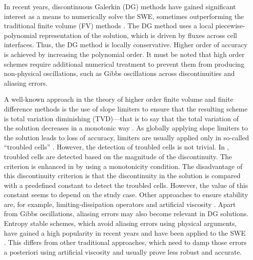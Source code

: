 In recent years, discontinuous Galerkin (DG) methods have gained significant interest as a means to numerically solve the SWE, sometimes outperforming the traditional finite volume (FV) methods \cite{CaviedesVoullieme2015, kesserwani2015,  Vater20151, Marras:2016, Kesserwani2019, Vater2019,  CaviedesVoullieme2020, NavasMontilla2020}.  The DG method uses a local piecewise-polynomial representation of the solution, which is driven by fluxes across cell interfaces.  Thus, the DG method is locally conservative.  Higher order of accuracy is achieved by increasing the polynomial order. It must be noted that high order schemes require additional numerical treatment to prevent them from producing non-physical oscillations, such as Gibbs oscillations across discontinuities and aliasing errors.

A well-known approach in the theory of higher order finite volume and finite difference methods is the use of slope limiters to ensure that the resulting scheme is total variation diminishing (TVD)---that is to say that the total variation of the solution decreases in a monotonic way \cite{leveque2}.  As globally applying slope limiters to the
solution leads to loss of accuracy, limiters are usually applied only in so-called ``troubled cells'' \cite{krivodonova2004, shu2005}. However, the detection of troubled cells is not trivial.  In \cite{Ambati2007452, krivodonova2004}, troubled cells are detected based on the magnitude of the discontinuity. The criterion is enhanced in \cite{kesserwani2015} by using a monotonicity condition.  The disadvantage of this discontinuity criterion is that the discontinuity in the solution is compared with a predefined constant to detect the troubled cells. However, the value of this constant seems to depend on the study case.  Other approaches to ensure stability are, for example, limiting-dissipation operators \cite{JAFFRE1995,  Ambati2007452} and artificial viscosity \cite{cesenek2013,  bublik2011, Bublik2015329}. Apart from Gibbs oscillations, aliasing errors may also become relevant in DG solutions. Entropy stable schemes, which avoid aliasing errors using physical arguments, have gained a high popularity in recent years \cite{GASSNER20162,MANZANERO2020}and have been applied to the SWE \cite{GASSNER2016,WINTERMEYER2018}. This differs from other traditional approaches, which need to damp those errors a posteriori using artificial viscosity and usually prove less robust and accurate. 

